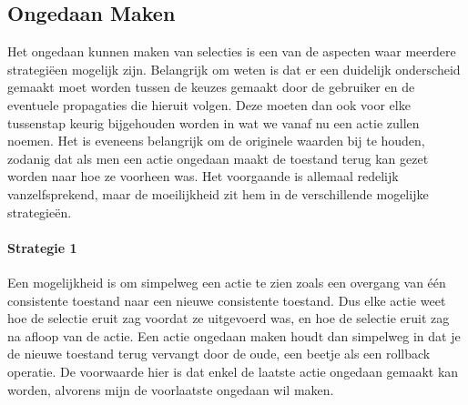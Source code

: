 \subsection{Ongedaan Maken}
Het ongedaan kunnen maken van selecties is een van de aspecten waar meerdere strategi\"{e}en mogelijk zijn. Belangrijk om weten is dat er een duidelijk onderscheid gemaakt moet worden tussen de keuzes gemaakt door de gebruiker en de eventuele propagaties die hieruit volgen. Deze moeten dan ook voor elke tussenstap keurig bijgehouden worden in wat we vanaf nu een actie zullen noemen. Het is eveneens belangrijk om de originele waarden bij te houden, zodanig dat als men een actie ongedaan maakt de toestand terug kan gezet worden naar hoe ze voorheen was. Het voorgaande is allemaal redelijk vanzelfsprekend, maar de moeilijkheid zit hem in de verschillende mogelijke strategie\"{e}n. 

\paragraph{Strategie 1}
Een mogelijkheid is om simpelweg een actie te zien zoals een overgang van \'{e}\'{e}n consistente toestand naar een nieuwe consistente toestand. Dus elke actie weet hoe de selectie eruit zag voordat ze uitgevoerd was, en hoe de selectie eruit zag na afloop van de actie. Een actie ongedaan maken houdt dan simpelweg in dat je de nieuwe toestand terug vervangt door de oude, een beetje als een rollback operatie. De voorwaarde hier is dat enkel de laatste actie ongedaan gemaakt kan worden, alvorens mijn de voorlaatste ongedaan wil maken. 

